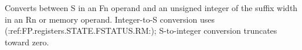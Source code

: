 Converts between S in an Fn operand and an unsigned integer of the suffix width in an Rn or memory operand.
Integer-to-S conversion uses (:ref:FP.registers.STATE.FSTATUS.RM:); S-to-integer conversion truncates toward zero.
